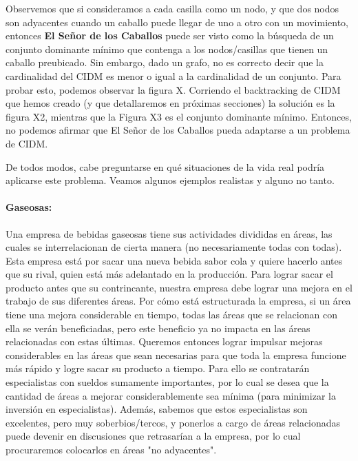 \documentclass[a4paper]{article}
\begin{document}
Observemos que si consideramos a cada casilla como un nodo, y que dos nodos son adyacentes cuando un caballo puede llegar de uno a otro con un movimiento, entonces {\bf El Señor de los Caballos} puede ser visto como la búsqueda de un conjunto dominante mínimo que contenga a los nodos/casillas que tienen un caballo preubicado. Sin embargo, dado un grafo, no es correcto decir que la cardinalidad del CIDM es menor o igual a la cardinalidad de un conjunto. Para probar esto, podemos observar la figura X. Corriendo el backtracking de CIDM que hemos creado (y que detallaremos en próximas secciones) la solución es la figura X2, mientras que la Figura X3 es el conjunto dominante mínimo. Entonces, no podemos afirmar que El Señor de los Caballos pueda adaptarse a un problema de CIDM. 


De todos modos, cabe preguntarse en qué situaciones de la vida real podría aplicarse este problema. Veamos algunos ejemplos realistas y alguno no tanto.


\paragraph{Gaseosas:} Una empresa de bebidas gaseosas tiene sus actividades divididas en áreas, las cuales se interrelacionan de cierta manera (no necesariamente todas con todas).  Esta empresa está por sacar una nueva bebida sabor cola y quiere hacerlo antes que su rival, quien está más adelantado en la producción.  Para lograr sacar el producto antes que su contrincante, nuestra empresa debe lograr una mejora en el trabajo de sus diferentes áreas.  Por cómo está estructurada la empresa, si un área tiene una mejora considerable en tiempo, todas las áreas que se relacionan con ella se verán beneficiadas, pero este beneficio ya no impacta en las áreas relacionadas con estas últimas.  Queremos entonces lograr impulsar mejoras considerables en las áreas que sean necesarias para que toda la empresa funcione más rápido y logre sacar su producto a tiempo.  Para ello se contratarán especialistas con sueldos sumamente importantes, por lo cual se desea que la cantidad de áreas a mejorar considerablemente sea mínima (para minimizar la inversión en especialistas).  Además, sabemos que estos especialistas son excelentes, pero muy soberbios/tercos, y ponerlos a cargo de áreas relacionadas puede devenir en discusiones que retrasarían a la empresa, por lo cual procuraremos colocarlos en áreas "no adyacentes".
\end{document}
